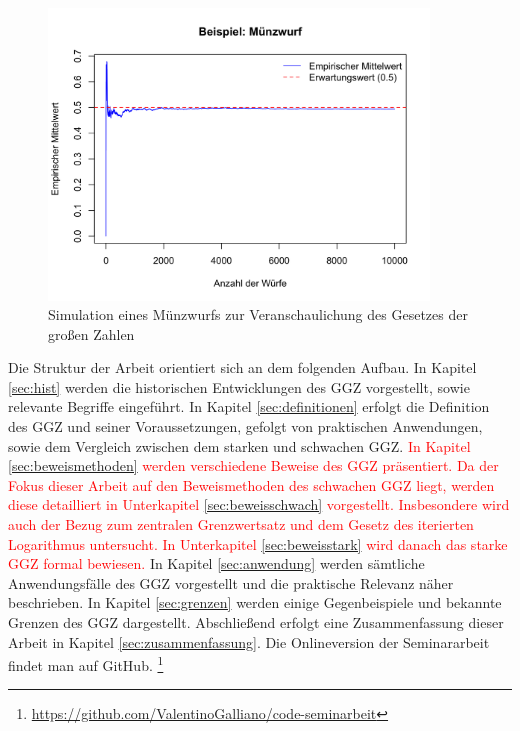\documentclass[aodsor,preprint]{imsart}
\numberwithin{equation}{section}
\theoremstyle{plain}
\begin{document}
\begin{figure}[h!]
  \centering
  \includegraphics[width=0.9\textwidth]{Muenzwurf.png}
  \caption{Simulation eines Münzwurfs zur Veranschaulichung des Gesetzes der großen Zahlen}
  \label{fig:muenzwurf}
\end{figure}

\newpage

Die Struktur der Arbeit orientiert sich an dem folgenden Aufbau.
In Kapitel \ref{sec:hist} werden die historischen Entwicklungen des GGZ vorgestellt, sowie relevante Begriffe eingeführt.
In Kapitel \ref{sec:definitionen} erfolgt die Definition des GGZ und seiner Voraussetzungen, gefolgt von praktischen Anwendungen, sowie dem Vergleich zwischen dem starken und schwachen GGZ.
\textcolor{red}{
In Kapitel \ref{sec:beweismethoden} werden verschiedene Beweise des GGZ präsentiert.
Da der Fokus dieser Arbeit auf den Beweismethoden des schwachen GGZ liegt, werden diese detailliert in Unterkapitel \ref{sec:beweisschwach} vorgestellt.
Insbesondere wird auch der Bezug zum zentralen Grenzwertsatz und dem Gesetz des iterierten Logarithmus untersucht.
In Unterkapitel \ref{sec:beweisstark} wird danach das starke GGZ formal bewiesen.
}
In Kapitel \ref{sec:anwendung} werden sämtliche Anwendungsfälle des GGZ vorgestellt und die praktische Relevanz näher beschrieben.
In Kapitel \ref{sec:grenzen} werden einige Gegenbeispiele und bekannte Grenzen des GGZ dargestellt. 
Abschließend erfolgt eine Zusammenfassung dieser Arbeit in Kapitel \ref{sec:zusammenfassung}.
Die Onlineversion der Seminararbeit findet man auf GitHub. \footnote{\url{https://github.com/ValentinoGalliano/code-seminarbeit}}
\end{document}
